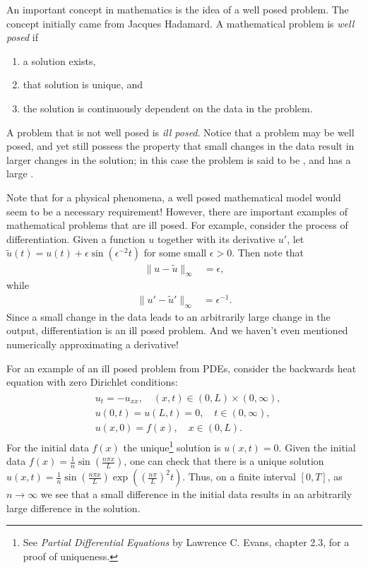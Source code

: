\label{lab:inverse_problems}

An important concept in mathematics is the idea of a well posed problem.
The concept initially came from Jacques Hadamard.
A mathematical problem is \textit{well posed} if 
\begin{enumerate}
	\item a solution exists, 
	\item that solution is unique, and 
	\item the solution is continuously dependent on the data in the problem.
\label{inverse_problems:continuous_dependence}
\end{enumerate}
A problem that is not well posed is \textit{ill posed}.
Notice that a problem may be well posed, and yet still possess the property that small changes in the data result in larger changes in the solution; in this case the problem is said to be , and has a large .

Note that for a physical phenomena, a well posed mathematical model would seem to be a necessary requirement!
However, there are important examples of mathematical problems that are ill posed.
For example, consider the process of differentiation.
Given a function $u$ together with its derivative $u'$, let $\tilde{u}(t) = u(t) +  \epsilon \sin(\epsilon^{-2}t)$ for some small $\epsilon > 0$.
Then note that 
\begin{align*}
	\|u-\tilde{u}\|_{\infty} &= \epsilon,
\end{align*}
while
\begin{align*}
	\|u'-\tilde{u}'\|_{\infty} &= \epsilon^{-1}.
\end{align*}
Since a small change in the data leads to an arbitrarily large change in the output, differentiation is an ill posed problem.
And we haven't even mentioned numerically approximating a derivative!

For an example of an ill posed problem from PDEs, consider the backwards heat equation with zero Dirichlet conditions: 
\begin{align}
\begin{split}
	&{} u_t = -u_{xx}, \quad (x,t) \in (0,L)\times (0,\infty),\\
	&{} u(0,t) = u(L,t) = 0, \quad t \in (0,\infty),\\
	&{} u(x,0) = f(x), \quad x \in (0,L).
\end{split}
\end{align}
For the initial data $f(x)$ the unique\footnote{See \textit{Partial Differential Equations} by Lawrence C. Evans, chapter 2.3, for a proof of uniqueness.} solution is $u(x,t) = 0.$ 
Given the initial data $f(x) = \frac{1}{n}\sin ( \frac{n \pi x}{L})$, one can check that there is a unique solution $u(x,t) = \frac{1}{n}\sin ( \frac{n \pi x}{L})\exp ( (\frac{n \pi }{L})^2 t)$. 
Thus, on a finite interval $[0,T]$, as $n \to \infty$ we see that a small difference in the initial data results in an arbitrarily large difference in the solution.

